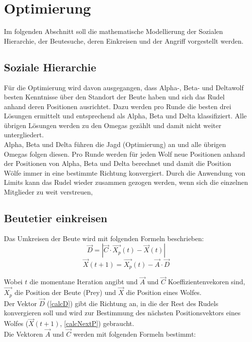 \chapter{Optimierung}
Im folgenden Abschnitt soll die mathematische Modellierung der Sozialen Hierarchie, der Beutesuche, deren Einkreisen und der Angriff vorgestellt werden.


\section{Soziale Hierarchie}
Für die Optimierung wird davon ausgegangen, dass Alpha-, Beta- und Deltawolf besten Kenntnisse über den Standort der Beute haben und sich das Rudel anhand deren Positionen ausrichtet. Dazu werden pro Runde die besten drei Lösungen ermittelt und entsprechend als Alpha, Beta und Delta klassifiziert. Alle übrigen Lösungen werden zu den Omegas gezählt und damit nicht weiter untergliedert. \\
Alpha, Beta und Delta führen die Jagd (Optimierung) an und alle übrigen Omegas folgen diesen. Pro Runde werden für jeden Wolf neue Positionen anhand der Positionen von Alpha, Beta und Delta berechnet und damit die Position Wölfe immer in eine bestimmte Richtung konvergiert. Durch die Anwendung von Limits kann das Rudel wieder zusammen gezogen werden, wenn sich die einzelnen Mitglieder zu weit verstreuen, \cite[vgl. Mirjalili 2014, S.5]{MIRJALILI201446}

\section{Beutetier einkreisen}
Das Umkreisen der Beute wird mit folgenden Formeln beschrieben:
\begin{equation}
    \vec{D} = |\vec{C} \cdot \vec{X_p}(t) - \vec{X}(t) |
    \label{calcD}
\end{equation}
\begin{equation}
    \vec{X}(t+1) = \vec{X_p}(t) - \vec{A} \cdot \vec{D}
    \label{calcNextP}
\end{equation}

Wobei $t$ die momentane Iteration angibt und $\vec{A}$ und $\vec{C}$ Koeffizientenvekoren sind, $\vec{X_p}$ die Position der Beute (Prey) und $\vec{X}$ die Position eines Wolfes.\\
Der Vektor $\vec{D}$ (\autoref{calcD}) gibt die Richtung an, in die der Rest des Rudels konvergieren soll und wird zur Bestimmung des nächsten Positionsvektors eines Wolfes ($\vec{X}(t+1)$, \autoref{calcNextP}) gebraucht.\\
Die Vektoren $\vec{A}$ und $\vec{C}$ werden mit folgenden Formeln bestimmt:

